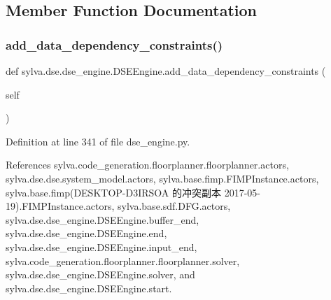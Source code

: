 \subsection{Member Function Documentation}
\mbox{\label{classsylva_1_1dse_1_1dse__engine_1_1_d_s_e_engine_a5d2b68f2c64c9edbc86ec584912261fd}} 
\subsubsection{\texorpdfstring{add\+\_\+data\+\_\+dependency\+\_\+constraints()}{add\_data\_dependency\_constraints()}}
{\footnotesize\ttfamily def sylva.\+dse.\+dse\+\_\+engine.\+D\+S\+E\+Engine.\+add\+\_\+data\+\_\+dependency\+\_\+constraints (\begin{DoxyParamCaption}\item[{}]{self }\end{DoxyParamCaption})}



Definition at line 341 of file dse\+\_\+engine.\+py.



References sylva.\+code\+\_\+generation.\+floorplanner.\+floorplanner.\+actors, sylva.\+dse.\+dse.\+system\+\_\+model.\+actors, sylva.\+base.\+fimp.\+F\+I\+M\+P\+Instance.\+actors, sylva.\+base.\+fimp(\+D\+E\+S\+K\+T\+O\+P-\/\+D3\+I\+R\+S\+O\+A 的冲突副本 2017-\/05-\/19).\+F\+I\+M\+P\+Instance.\+actors, sylva.\+base.\+sdf.\+D\+F\+G.\+actors, sylva.\+dse.\+dse\+\_\+engine.\+D\+S\+E\+Engine.\+buffer\+\_\+end, sylva.\+dse.\+dse\+\_\+engine.\+D\+S\+E\+Engine.\+end, sylva.\+dse.\+dse\+\_\+engine.\+D\+S\+E\+Engine.\+input\+\_\+end, sylva.\+code\+\_\+generation.\+floorplanner.\+floorplanner.\+solver, sylva.\+dse.\+dse\+\_\+engine.\+D\+S\+E\+Engine.\+solver, and sylva.\+dse.\+dse\+\_\+engine.\+D\+S\+E\+Engine.\+start.


